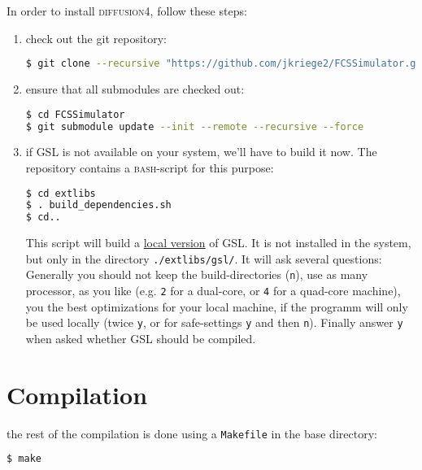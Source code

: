 \documentclass[a4paper,twoside,10pt]{report}
\newcommand{\df}{\textsc{diffusion4}\xspace}
\newcommand{\bash}{\textsc{bash}\xspace}
\newcommand{\gsl}{\textsc{GSL}\xspace}
\newcommand{\GSL}{\gsl}
\begin{document}
\noindent In order to install \df, follow these steps:
\begin{enumerate}
	\item check out the git repository: 
	  \begin{lstlisting}[language=bash] 
$ git clone --recursive "https://github.com/jkriege2/FCSSimulator.git"
		\end{lstlisting}
	\item ensure that all submodules are checked out: 
	  \begin{lstlisting}[language=bash] 
$ cd FCSSimulator
$ git submodule update --init --remote --recursive --force
		\end{lstlisting}
	\item if GSL is not available on your system, we'll have to build it now. The repository contains a \bash-script for this purpose: 
	  \begin{lstlisting}[language=bash] 
$ cd extlibs
$ . build_dependencies.sh
$ cd..
		\end{lstlisting}
		This script will build a \underline{local version} of \GSL. It is not installed in the system, but only in the directory \texttt{./extlibs/gsl/}. It will ask several questions: Generally you should not keep the build-directories (\texttt{n}), use as many processor, as you like (e.g. \texttt{2} for a dual-core, or \texttt{4} for a quad-core machine), you the best optimizations for your local machine, if the programm will only be used locally (twice \texttt{y}, or for safe-settings \texttt{y} and then \texttt{n}). Finally answer \texttt{y} when asked whether GSL should be compiled.
\end{enumerate}

\section{Compilation}
\label{sec:Compilation}
the rest of the compilation is done using a \texttt{Makefile} in the base directory:
\begin{lstlisting}[language=bash] 
$ make 
\end{lstlisting}
\end{document}

